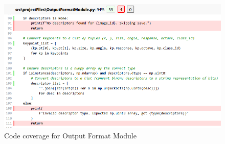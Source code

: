 \documentclass[12pt, titlepage]{article}
\begin{document}
\begin{figure}[]
  \centering
  \includegraphics[width=0.95\linewidth]{images/cov_OUTFORM.png}
  \caption{Code coverage for Output Format Module}
  \label{Coverage_Output}
\end{figure}






\clearpage


\end{document}
